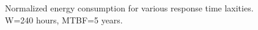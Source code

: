 \begin{figure}[!t]	
	\begin{center}
	\end{center}
	\caption{Normalized energy consumption for various response time laxities. W=240 hours, MTBF=5 years.}
	\label{fig:alpha}
\end{figure}


